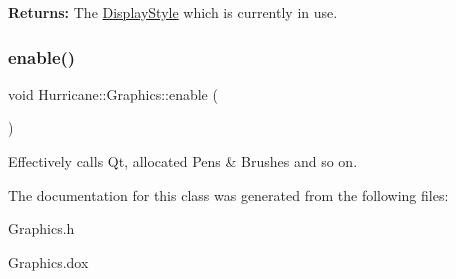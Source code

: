 {\bfseries Returns\+:} The \hyperlink{classHurricane_1_1DisplayStyle}{Display\+Style} which is currently in use. \mbox{\label{classHurricane_1_1Graphics_a08e5240382c4bc97fd84b6fa0e7d8b8e}} 
\subsubsection{\texorpdfstring{enable()}{enable()}}
{\footnotesize\ttfamily void Hurricane\+::\+Graphics\+::enable (\begin{DoxyParamCaption}{ }\end{DoxyParamCaption})\hspace{0.3cm}{\ttfamily [static]}}

Effectively calls Qt, allocated Pens \& Brushes and so on. 

The documentation for this class was generated from the following files\+:\begin{DoxyCompactItemize}
\item 
Graphics.\+h\item 
Graphics.\+dox\end{DoxyCompactItemize}

